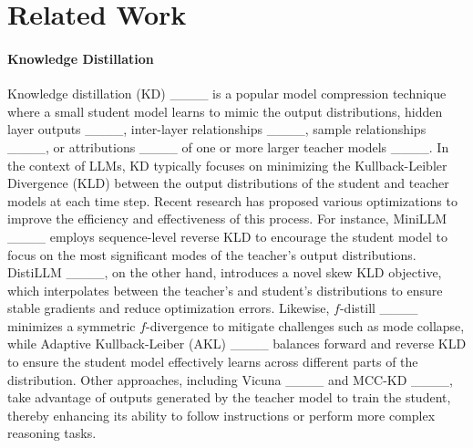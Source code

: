 \section{Related Work}
\label{gen_inst}
\vspace{-0.5em}
\paragraph{Knowledge Distillation}

Knowledge distillation (KD) ____ is a popular model compression technique where a small student model learns to mimic the output distributions, hidden layer outputs ____, inter-layer relationships ____, sample relationships ____, or attributions ____ of one or more larger teacher models ____. In the context of LLMs, KD typically focuses on minimizing the Kullback-Leibler Divergence (KLD) between the output distributions of the student and teacher models at each time step. Recent research has proposed various optimizations to improve the efficiency and effectiveness of this process. For instance, MiniLLM ____ employs sequence-level reverse KLD to encourage the student model to focus on the most significant modes of the teacher's output distributions. DistiLLM ____, on the other hand, %
introduces a novel skew KLD objective, which interpolates between the teacher's and student's distributions to ensure stable gradients and reduce optimization errors.
Likewise, $f$-distill ____ minimizes a symmetric $f$-divergence to mitigate challenges such as mode collapse, while Adaptive Kullback-Leiber (AKL) ____ balances forward and reverse KLD to ensure the student model effectively learns across different parts of the distribution. Other approaches, including Vicuna ____ and MCC-KD ____, take advantage of outputs generated by the teacher model to train the student, thereby enhancing its ability to follow instructions or perform more complex reasoning tasks.
\vspace{-0.5em}
